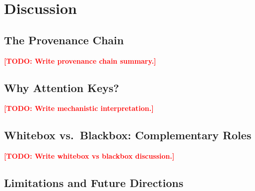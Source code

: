 \documentclass{article}
\newcommand{\TODO}[1]{\textcolor{red}{\textbf{[TODO: #1]}}}
\begin{document}
\section{Discussion}
\label{sec:discussion}

\subsection{The Provenance Chain}
\label{sec:discussion:chain}

\TODO{Write provenance chain summary.}

\subsection{Why Attention Keys?}
\label{sec:discussion:keys}

\TODO{Write mechanistic interpretation.}

\subsection{Whitebox vs.\ Blackbox: Complementary Roles}
\label{sec:discussion:wb_bb}

\TODO{Write whitebox vs blackbox discussion.}

\subsection{Limitations and Future Directions}
\label{sec:discussion:limitations}
\end{document}

